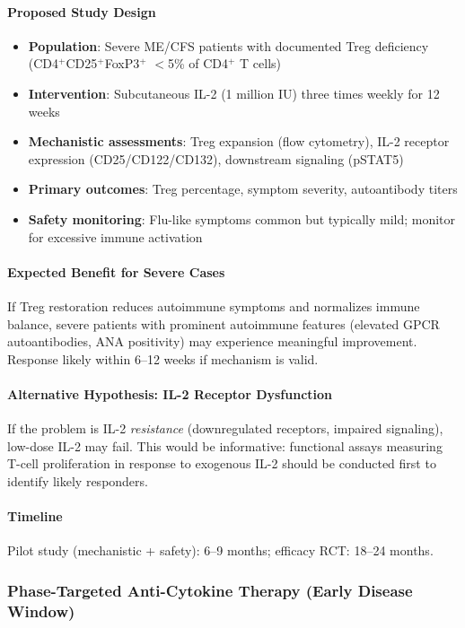 \paragraph{Proposed Study Design}
\begin{itemize}
    \item \textbf{Population}: Severe ME/CFS patients with documented Treg deficiency (CD4$^+$CD25$^+$FoxP3$^+$ $<$5\% of CD4$^+$ T cells)
    \item \textbf{Intervention}: Subcutaneous IL-2 (1 million IU) three times weekly for 12 weeks
    \item \textbf{Mechanistic assessments}: Treg expansion (flow cytometry), IL-2 receptor expression (CD25/CD122/CD132), downstream signaling (pSTAT5)
    \item \textbf{Primary outcomes}: Treg percentage, symptom severity, autoantibody titers
    \item \textbf{Safety monitoring}: Flu-like symptoms common but typically mild; monitor for excessive immune activation
\end{itemize}

\paragraph{Expected Benefit for Severe Cases}
If Treg restoration reduces autoimmune symptoms and normalizes immune balance, severe patients with prominent autoimmune features (elevated GPCR autoantibodies, ANA positivity) may experience meaningful improvement. Response likely within 6--12 weeks if mechanism is valid.

\paragraph{Alternative Hypothesis: IL-2 Receptor Dysfunction}
If the problem is IL-2 \emph{resistance} (downregulated receptors, impaired signaling), low-dose IL-2 may fail. This would be informative: functional assays measuring T-cell proliferation in response to exogenous IL-2 should be conducted first to identify likely responders.

\paragraph{Timeline}
Pilot study (mechanistic + safety): 6--9 months; efficacy RCT: 18--24 months.

\subsubsection{Phase-Targeted Anti-Cytokine Therapy (Early Disease Window)}

